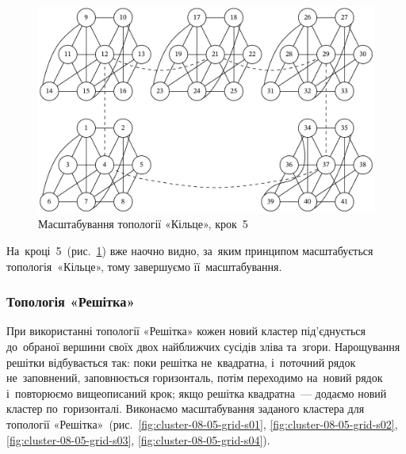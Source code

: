 \documentclass[
	a4paper,
	oneside,
	BCOR = 10mm,
	DIV = 12,
	12pt,
	headings = normal,
]{scrartcl}
\begin{document}
				\begin{figure}[!htbp]
					\centering
					\includegraphics[height=12\baselineskip]{./assets/cluster-08-04-ring-s05.pdf}
					\caption{Масштабування топології «Кільце», крок~5}
					\label{fig:cluster-08-04-ring-s05}
				\end{figure}

				На~кроці~5~(рис.~\ref{fig:cluster-08-04-ring-s05}) вже наочно видно, за~яким принципом масштабується топологія~«Кільце», тому завершуємо її~масштабування.

			\subsubsection{Топологія «Решітка»}
				При використанні топології «Решітка» кожен новий кластер під'єднується до~обраної вершини своїх двох найближчих сусідів зліва та~згори. Нарощування решітки відбувається так: поки решітка не~квадратна, і~поточний рядок не~заповнений, заповнюється горизонталь, потім переходимо на~новий рядок і~повторюємо вищеописаний крок; якщо решітка квадратна~— додаємо новий кластер по~горизонталі. Виконаємо масштабування заданого кластера для топології «Решітка»~(рис.~\ref{fig:cluster-08-05-grid-s01}, \ref{fig:cluster-08-05-grid-s02}, \ref{fig:cluster-08-05-grid-s03}, \ref{fig:cluster-08-05-grid-s04}).
\end{document}
